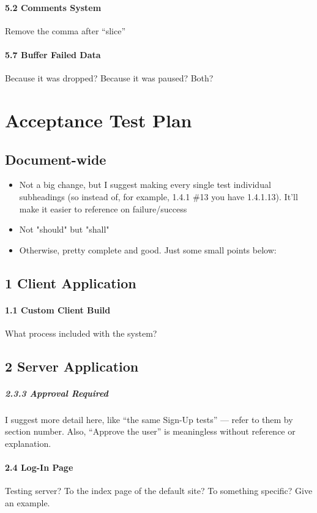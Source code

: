 \documentclass{article}
\begin{document}
\paragraph{5.2  Comments System}
    Remove the comma after ``slice''
\paragraph{5.7  Buffer Failed Data}
    Because it was dropped?  Because it was paused?  Both?


\section{Acceptance Test Plan}

\subsection{Document-wide}

\begin{itemize}
    \item Not a big change, but I suggest making every single test individual
        subheadings (so instead of, for example, 1.4.1 \#13 you have 1.4.1.13).
        It'll make it easier to reference on failure/success
    \item Not "should" but "shall"
    \item Otherwise, pretty complete and good.  Just some small points below:
\end{itemize}


\subsection{1 Client Application}

\paragraph{1.1  Custom Client Build}
    What process included with the system?


\subsection{2 Server Application}
\subparagraph{2.3.3  Approval Required}
    I suggest more detail here, like ``the same Sign-Up tests'' --- refer to them
    by section number.  Also, ``Approve the user'' is meaningless without
    reference or explanation.

\paragraph{2.4  Log-In Page}
    Testing server?  To the index page of the default site?  To something
    specific?  Give an example.
\end{document}
